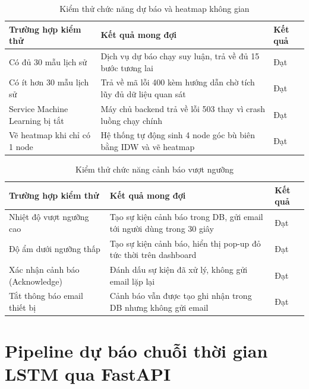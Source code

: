 \begin{table}[H]
  \centering
  \caption{Kiểm thử chức năng dự báo và heatmap không gian}
  \label{tab:test_forecast}
  \begin{tabularx}{\textwidth}{p{4cm} X p{1.5cm}}
    \toprule
    \textbf{Trường hợp kiểm thử} & \textbf{Kết quả mong đợi}
      & \textbf{Kết quả} \\
    \midrule
    Có đủ 30 mẫu lịch sử
      & Dịch vụ dự báo chạy suy luận, trả về đủ 15 bước tương lai
      & Đạt \\
    Có ít hơn 30 mẫu lịch sử
      & Trả về mã lỗi 400 kèm hướng dẫn chờ tích lũy đủ dữ liệu quan sát
      & Đạt \\
    Service Machine Learning bị tắt
      & Máy chủ backend trả về lỗi 503 thay vì crash luồng chạy chính
      & Đạt \\
    Vẽ heatmap khi chỉ có 1 node
      & Hệ thống tự động sinh 4 node góc bù biên bằng IDW và vẽ heatmap
      & Đạt \\
    \bottomrule
  \end{tabularx}
\end{table}

\begin{table}[H]
  \centering
  \caption{Kiểm thử chức năng cảnh báo vượt ngưỡng}
  \label{tab:test_alert}
  \begin{tabularx}{\textwidth}{p{4cm} X p{1.5cm}}
    \toprule
    \textbf{Trường hợp kiểm thử} & \textbf{Kết quả mong đợi}
      & \textbf{Kết quả} \\
    \midrule
    Nhiệt độ vượt ngưỡng cao
      & Tạo sự kiện cảnh báo trong DB, gửi email tới người dùng trong 30 giây
      & Đạt \\
    Độ ẩm dưới ngưỡng thấp
      & Tạo sự kiện cảnh báo, hiển thị pop-up đỏ tức thời trên dashboard
      & Đạt \\
    Xác nhận cảnh báo (Acknowledge)
      & Đánh dấu sự kiện đã xử lý, không gửi email lặp lại
      & Đạt \\
    Tắt thông báo email thiết bị
      & Cảnh báo vẫn được tạo ghi nhận trong DB nhưng không gửi email
      & Đạt \\
    \bottomrule
  \end{tabularx}
\end{table}

\section{Pipeline dự báo chuỗi thời gian LSTM qua FastAPI}
\label{sec:contrib:lstm}

